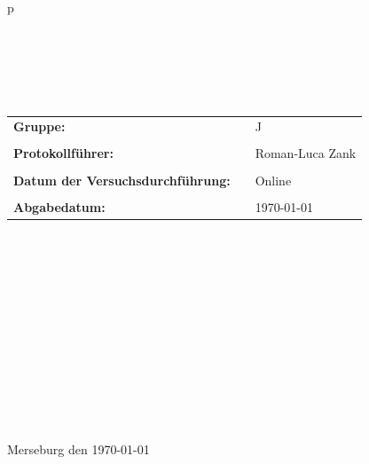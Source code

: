 \begin{center}
\begin{tabular}{p{\textwidth}}
\\ \\ \\ \\ \\ \\

\begin{center}
\begin{tabular}{lll}
\large{\textbf{Gruppe:}} & & \large{J}\\
&&\\
\large{\textbf{Protokollführer:}} & & \large{Roman-Luca Zank}\\
&&\\
\large{\textbf{Datum der Versuchsdurchführung:}}&& \large{Online}\\
&&\\
\large{\textbf{Abgabedatum:}}&& \large{\today}
\end{tabular}
\end{center}

\\ \\ \\ \\ \\ \\ \\ \\ \\ \\ \\ \\
\large{Merseburg den \today}

\end{tabular}
\end{center}
